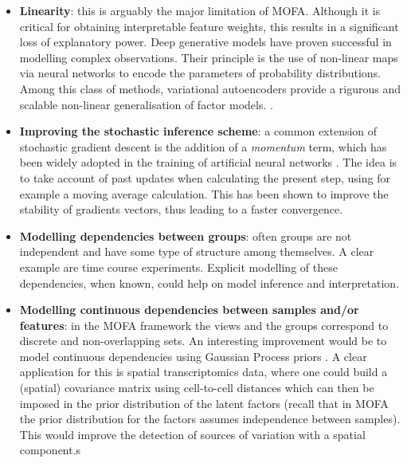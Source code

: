 \begin{itemize}
	\item \textbf{Linearity}: this is arguably the major limitation of MOFA. Although it is critical for obtaining interpretable feature weights, this results in a significant loss of explanatory power. Deep generative models have proven successful in modelling complex observations. Their principle is the use of non-linear maps via neural networks to encode the parameters of probability distributions. Among this class of methods, variational autoencoders provide a rigurous and scalable non-linear generalisation of factor models. \cite{Ainsworth2018}.

	\item \textbf{Improving the stochastic inference scheme}: a common extension of stochastic gradient descent is the addition of a \textit{momentum} term, which has been widely adopted in the training of artificial neural networks \cite{Zeiler2012,Ning1999}. The idea is to take account of past updates when calculating the present step, using for example a moving average calculation. This has been shown to improve the stability of gradients vectors, thus leading to a faster convergence.

	\item \textbf{Modelling dependencies between groups}: often groups are not independent and have some type of structure among themselves. A clear example are time course experiments. Explicit modelling of these dependencies, when known, could help on model inference and interpretation.

	\item \textbf{Modelling continuous dependencies between samples and/or features}: in the MOFA framework the views and the groups correspond to discrete and non-overlapping sets. An interesting improvement would be to model continuous dependencies using Gaussian Process priors \cite{XX}. A clear application for this is  spatial transcriptomics data, where one could build a (spatial) covariance matrix using cell-to-cell distances which can then be imposed in the prior distribution of the latent factors (recall that in MOFA the prior distribution for the factors assumes independence between samples). This would improve the detection of sources of variation with a spatial component.s

\end{itemize}